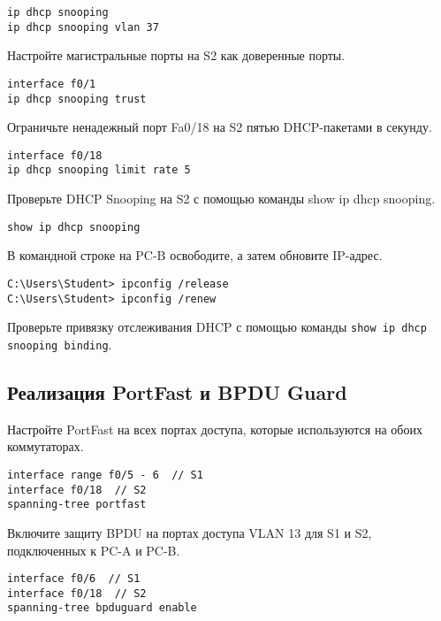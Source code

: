 \begin{verbatim}
ip dhcp snooping
ip dhcp snooping vlan 37
\end{verbatim}

Настройте магистральные порты на S2 как доверенные порты.

\begin{verbatim}
interface f0/1
ip dhcp snooping trust
\end{verbatim}

Ограничьте ненадежный порт Fa0/18 на S2 пятью DHCP-пакетами в секунду.

\begin{verbatim}
interface f0/18
ip dhcp snooping limit rate 5
\end{verbatim}

Проверьте DHCP Snooping на S2 с помощью команды show ip dhcp snooping.

\begin{verbatim}
show ip dhcp snooping
\end{verbatim}



В командной строке на PC-B освободите, а затем обновите IP-адрес.

\begin{verbatim}
C:\Users\Student> ipconfig /release
C:\Users\Student> ipconfig /renew
\end{verbatim}


Проверьте привязку отслеживания DHCP
с помощью команды \texttt{show ip dhcp snooping binding}.


\subsection{Реализация PortFast и BPDU Guard}

Настройте PortFast на всех портах доступа,
которые используются на обоих коммутаторах.

\begin{verbatim}
interface range f0/5 - 6  // S1
interface f0/18  // S2
spanning-tree portfast
\end{verbatim}

Включите защиту BPDU на портах доступа VLAN 13 для S1 и S2,
подключенных к PC-A и PC-B.

\begin{verbatim}
interface f0/6  // S1
interface f0/18  // S2
spanning-tree bpduguard enable
\end{verbatim}

